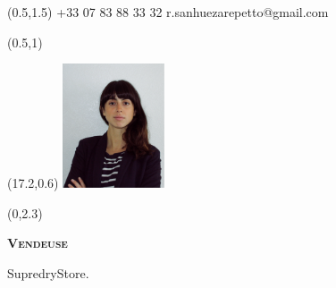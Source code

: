 \documentclass[30pt, french]{tccv}
\begin{document}
\begin{upshape}
\fontsize{9pt}{1em}\color{text}\selectfont



%
%




\begin{textblock}{6.5}(0.5,1.5)
    {+33 07 83 88 33 32}
    {r.sanhuezarepetto@gmail.com}
\end{textblock}

\begin{textblock}{21}(0.5,1)
\end{textblock}

\begin{textblock}{21}(17.2,0.6)
		\includegraphics[width=3cm]{../Figure/Rocio3.png}
\end{textblock}  



\begin{textblock}{21}(0,2.3)

\begin{center}
	{\fontsize{20pt}{5em}\scshape\bfseries Vendeuse  \\} 

	\vspace{5pt}
	
	{\fontsize{12pt}{2.5em}\color{text}\bodyfontlight\upshape SupredryStore. \\}
\end{center}
\end{textblock}  





%
%





\end{upshape}
\end{document}
